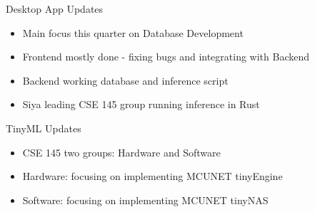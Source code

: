 \begin{frame}{Desktop App Updates}
    \begin{itemize}
        \item Main focus this quarter on Database Development
        \item Frontend mostly done - fixing bugs and integrating with Backend
        \item Backend working database and inference script
        \item Siya leading CSE 145 group running inference in Rust
    \end{itemize}    
\end{frame}

\begin{frame}{TinyML Updates}
    \begin{itemize}
        \item CSE 145 two groups: Hardware and Software
        \item Hardware: focusing on implementing MCUNET tinyEngine 
        \item Software: focusing on implementing MCUNET tinyNAS
    \end{itemize}    
\end{frame}